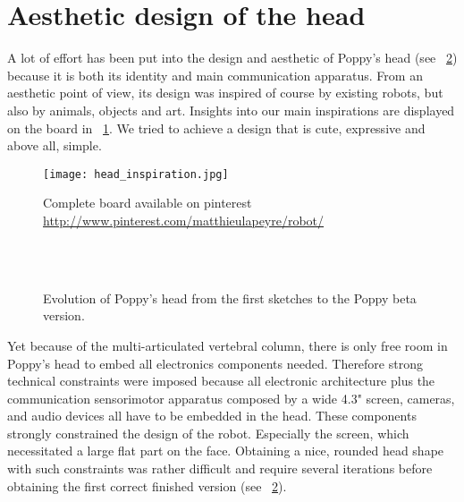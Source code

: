 
\section{Aesthetic design of the head } %
\label{sec:head-design}
A lot of effort has been put into the design and aesthetic of Poppy's head (see \figurename~\ref{fig:poppy_head_beta}) because it is both its identity and main communication apparatus.
From an aesthetic point of view, its design was inspired of course by existing robots, but also by animals, objects and art. Insights into our  main inspirations are displayed on the board in \figurename~\ref{fig:head_inspiration}. We tried to achieve a design that is cute, expressive and above all, simple.

\begin{figure}[p]
    \begin{center}
        \texttt{[image: head\_inspiration.jpg]}
    \end{center}
    \caption{Complete board available on pinterest \url{http://www.pinterest.com/matthieulapeyre/robot/}}
    \label{fig:head_inspiration}
\end{figure}

\begin{figure}[p]
\centering
    \hfill
    \\
    \hfill
    \\
    \hfill
    \caption{Evolution of Poppy’s head from the first sketches to the Poppy beta version.}
    \label{fig:poppy_head_beta}
\end{figure}

Yet because of the multi-articulated vertebral column, there is only free room in Poppy’s head to embed all electronics components needed. Therefore strong technical constraints were imposed because all electronic architecture plus the communication sensorimotor apparatus composed by a wide 4.3" screen, cameras, and audio devices all have to be embedded in the head.
These components strongly constrained the design of the robot. Especially the screen, which necessitated a large flat part on the face. Obtaining a nice, rounded head shape with such constraints was rather difficult and require several iterations before obtaining the first correct finished version (see \figurename~\ref{fig:poppy_head_beta}).

